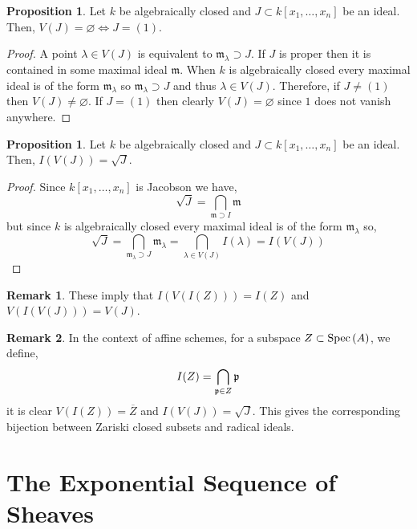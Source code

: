\documentclass[12pt]{extarticle}
\theoremstyle{definition}
\newtheorem{proposition}[theorem]{Proposition}
\newtheorem{remark}{Remark}
\newcommand{\m}{\mathfrak{m}}
\begin{document}
\begin{proposition}
Let $k$ be algebraically closed and $J \subset k[x_1,\dots, x_n]$ be an ideal. Then, $V(J) = \varnothing \iff J = (1)$. 
\end{proposition}

\begin{proof}
A point $\lambda \in V(J)$ is equivalent to $\m_\lambda \supset J$. If $J$ is proper then it is contained in some maximal ideal $\m$. When $k$ is algebraically closed every maximal ideal is of the form $\m_\lambda$ so $\m_\lambda \supset J$ and thus $\lambda \in V(J)$. Therefore, if $J \neq (1)$ then $V(J) \neq \varnothing$. If $J = (1)$ then clearly $V(J) = \varnothing$ since $1$ does not vanish anywhere.
\end{proof}

\begin{proposition}
Let $k$ be algebraically closed and $J \subset k[x_1,\dots, x_n]$ be an ideal. Then, $I(V(J)) = \sqrt{J}$. 
\end{proposition}

\begin{proof}
Since $k[x_1, \dots, x_n]$ is Jacobson we have,
\[ \sqrt{J} = \bigcap_{\m \supset I} \m \]
but since $k$ is algebraically closed every maximal ideal is of the form $\m_\lambda$ so,
\[ \sqrt{J} = \bigcap_{\m_\lambda \supset J} \m_\lambda = \bigcap_{\lambda \in V(J)} I(\lambda) = I(V(J)) \]
\end{proof}

\begin{remark}
These imply that $I(V(I(Z))) = I(Z)$ and $V(I(V(J))) = V(J)$.
\end{remark}

\begin{remark}
In the context of affine schemes, for a subspace $Z \subset \mathrm{Spec}\left(A\right)$, we define,
\[ I(Z) = \bigcap_{\mathfrak{p} \in Z} \mathfrak{p} \] 
 it is clear $V(I(Z)) = \overline{Z}$ and $I(V(J)) = \sqrt{J}$. This gives the corresponding bijection between Zariski closed subsets and radical ideals.
\end{remark}

\section{The Exponential Sequence of Sheaves}

\newcommand{\Piczero}[1]{\mathrm{Pic}^0\left( #1 \right)}
\end{document}
